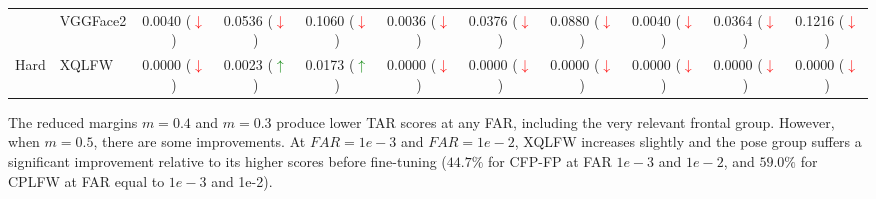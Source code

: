 \documentclass[class=report, crop=false, a4paper, 12pt]{standalone}
\begin{document}
\begin{table}[H]
{\begin{tabular}{cl|ccc|ccc|ccc|}
    \multicolumn{1}{|c|}{}                          & VGGFace2 & \multicolumn{1}{c|}{{\color[HTML]{333333} 0.0040 (\textcolor{red}{$\downarrow$})}} & \multicolumn{1}{c|}{{\color[HTML]{333333} 0.0536 (\textcolor{red}{$\downarrow$})}} & {\color[HTML]{333333} 0.1060 (\textcolor{red}{$\downarrow$})} & \multicolumn{1}{c|}{0.0036 (\textcolor{red}{$\downarrow$})} & \multicolumn{1}{c|}{0.0376 (\textcolor{red}{$\downarrow$})} & 0.0880 (\textcolor{red}{$\downarrow$}) & \multicolumn{1}{c|}{0.0040 (\textcolor{red}{$\downarrow$})} & \multicolumn{1}{c|}{0.0364 (\textcolor{red}{$\downarrow$})} & 0.1216 (\textcolor{red}{$\downarrow$}) \\ \cline{2-11} 
    \multicolumn{1}{|c|}{\multirow{-2}{*}{Hard}}    & XQLFW    & \multicolumn{1}{c|}{{\color[HTML]{333333} 0.0000 (\textcolor{red}{$\downarrow$})}} & \multicolumn{1}{c|}{{\color[HTML]{333333} 0.0023 (\textcolor{green}{$\uparrow$})}} & {\color[HTML]{333333} 0.0173 (\textcolor{green}{$\uparrow$})} & \multicolumn{1}{c|}{0.0000 (\textcolor{red}{$\downarrow$})} & \multicolumn{1}{c|}{0.0000 (\textcolor{red}{$\downarrow$})} & 0.0000 (\textcolor{red}{$\downarrow$}) & \multicolumn{1}{c|}{0.0000 (\textcolor{red}{$\downarrow$})} & \multicolumn{1}{c|}{0.0000 (\textcolor{red}{$\downarrow$})} & 0.0000 (\textcolor{red}{$\downarrow$}) \\ \hline
    \end{tabular}%
    }
\end{table}

The reduced margins $m=0.4$ and $m=0.3$ produce lower TAR scores at any FAR, including the very relevant frontal group. However, when $m=0.5$, there are some improvements. At $FAR=1e-3$ and $FAR=1e-2$, XQLFW increases slightly and the pose group suffers a significant improvement relative to its higher scores before fine-tuning ($44.7\%$ for CFP-FP at FAR $1e-3$ and $1e-2$, and $59.0\%$ for CPLFW at FAR equal to $1e-3$ and 1e-2).
\end{document}
